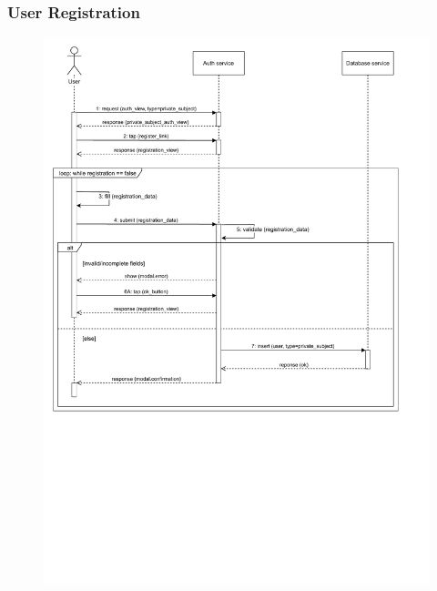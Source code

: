 \documentclass[12pt,a4paper]{article}
\begin{document}
\subsubsection{User Registration}
	\begin{figure}[H]
				\centering
				\includegraphics[width=1\textwidth,height=0.9\textheight,keepaspectratio]{assets/sequence_diagrams/exports/registration_private_subject.pdf}
				\label{fig:registration_sequence}
			\end{figure}
\end{document}
